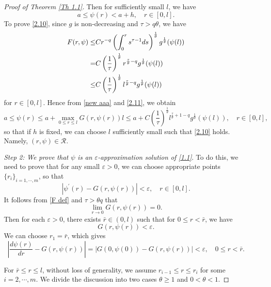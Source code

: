 \documentclass[a4paper,11pt]{amsart}
\theoremstyle{plain}
\theoremstyle{remark}
\numberwithin{equation}{section}
\numberwithin{figure}{section}
\numberwithin{remark}{section}
\begin{document}
\begin{sloppypar}
\begin{proof}[Proof of Theorem \ref{Th 1.1}]
	Then for sufficiently small $l$, we have 
	\begin{equation}\label{2.10}
	a \le \psi(r) < a+h, \quad r\in [0,l].
	\end{equation}
	To prove \eqref{2.10}, since $g$ is non-decreasing and $\tau > q\theta$, we have
	\begin{align}
	F(r, \psi) \le & C  r^{-q}  \left(  \int_{0}^{r} s^{\tau-1} ds \right )^{\frac{1}{\theta}}g^{\frac{1}{\theta}} (\psi(l)) \notag\\
		        = & C \left( \frac{1}{\tau} \right)^{\frac{1}{\theta}} r^{\frac{\tau}{\theta}-q} g^{\frac{1}{\theta}}(\psi(l))  \label{2.11} \\
	   	      \le & C \left( \frac{1}{\tau} \right)^{\frac{1}{\theta}} l^{\frac{\tau}{\theta}-q} g^{\frac{1}{\theta}}(\psi(l)) \notag
	\end{align}
	for $r\in [0,l]$.
	Hence from \eqref{new aaa} and \eqref{2.11}, we obtain
	\begin{equation*}
	a \le \psi(r) \le a + \max\limits_{0\le r\le l} G(r, \psi(r)) l \le a + C \left( \frac{1}{\tau} \right)^{\frac{1}{\theta}} l^{\frac{\tau}{\theta}+1-q} g^{\frac{1}{\theta}}(\psi(l)), \quad r\in [0,l],
	\end{equation*}
	so that if $h$ is fixed, we can choose $l$ sufficiently small such that \eqref{2.10} holds. Namely, $(r, \psi)\in \mathcal{R}$.

	\vspace{2mm}
	
	\textit{Step 2: We prove that $\psi$ is an $\varepsilon$-approximation solution of \eqref{1.1}}. To do this, we need to prove that for any small $\varepsilon > 0$, we can choose appropriate points $\{r_i\}_{i=1,\cdots,m}$, so that
	\begin{equation}\label{2.13}
		\left| \psi^{\prime}(r)-G(r,\psi(r))\right| <\varepsilon, \quad r\in [0,l].
	\end{equation}
	It follows from \eqref{F def} and $\tau>\theta q$ that
	$$\lim_{r\to 0}G(r,\psi(r))=0.$$
	Then for each $\varepsilon>0$, there exists $\bar r \in (0,l)$ such that for $0\leq r< \bar r$, we have
	$$G(r,\psi(r))<\varepsilon.$$
	We can choose $r_1=\bar r$, which gives
	\begin{equation}\label{2.14}
		\left| \frac{d\psi(r)}{dr}-G(r,\psi(r))\right| =\left| G(0, \psi(0))-G(r,\psi(r))\right| <\varepsilon,	\quad 0\le r< \bar r.
	\end{equation}
	
For $\bar r\leq r \le l$, without loss of generality, we assume $r_{i-1} \le r \le r_i$ for some $i=2,\cdots,m$.
We divide the discussion into two cases $\theta \ge 1$ and $0< \theta < 1$. 


\end{proof}
\end{sloppypar}
\end{document}
